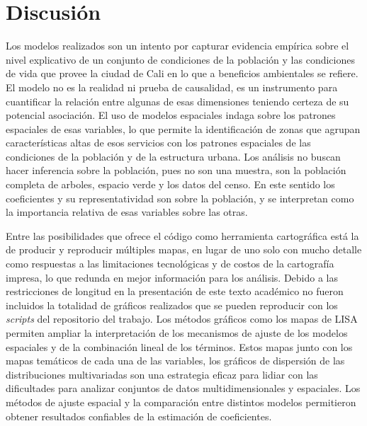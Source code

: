 \documentclass[12pt,a4paper,oneside, openany]{book}
\theoremstyle{definition}
\theoremstyle{definition}
\theoremstyle{definition}
\theoremstyle{remark}
\begin{document}
\chapter{Discusión}\label{discusion}

Los modelos realizados son un intento por capturar evidencia empírica
sobre el nivel explicativo de un conjunto de condiciones de la población
y las condiciones de vida que provee la ciudad de Cali en lo que a
beneficios ambientales se refiere. El modelo no es la realidad ni prueba
de causalidad, es un instrumento para cuantificar la relación entre
algunas de esas dimensiones teniendo certeza de su potencial asociación.
El uso de modelos espaciales indaga sobre los patrones espaciales de
esas variables, lo que permite la identificación de zonas que agrupan
características altas de esos servicios con los patrones espaciales de
las condiciones de la población y de la estructura urbana. Los análisis
no buscan hacer inferencia sobre la población, pues no son una muestra,
son la población completa de arboles, espacio verde y los datos del
censo. En este sentido los coeficientes y su representatividad son sobre
la población, y se interpretan como la importancia relativa de esas
variables sobre las otras.

Entre las posibilidades que ofrece el código como herramienta
cartográfica está la de producir y reproducir múltiples mapas, en lugar
de uno solo con mucho detalle como respuestas a las limitaciones
tecnológicas y de costos de la cartografía impresa, lo que redunda en
mejor información para los análisis. Debido a las restricciones de
longitud en la presentación de este texto académico no fueron incluidos
la totalidad de gráficos realizados que se pueden reproducir con los
\emph{scripts} del repositorio del trabajo. Los métodos gráficos como
los mapas de LISA permiten ampliar la interpretación de los mecanismos
de ajuste de los modelos espaciales y de la combinación lineal de los
términos. Estos mapas junto con los mapas temáticos de cada una de las
variables, los gráficos de dispersión de las distribuciones
multivariadas son una estrategia eficaz para lidiar con las dificultades
para analizar conjuntos de datos multidimensionales y espaciales. Los
métodos de ajuste espacial y la comparación entre distintos modelos
permitieron obtener resultados confiables de la estimación de
coeficientes.
\end{document}
